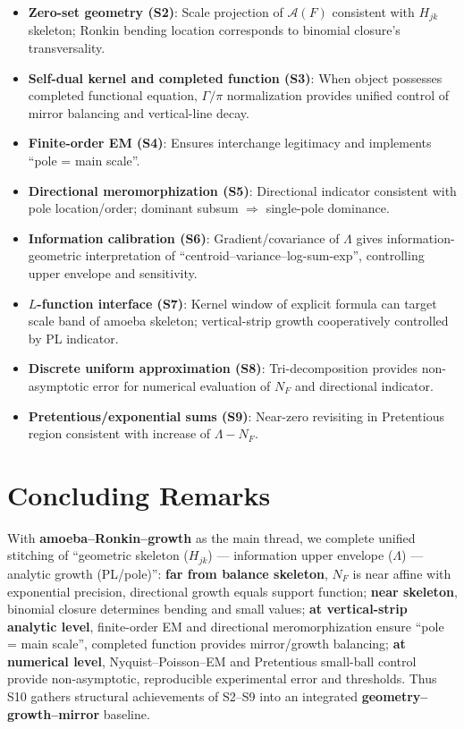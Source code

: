 \documentclass[11pt,a4paper]{article}
\theoremstyle{remark}
\begin{document}
\begin{itemize}
\item \textbf{Zero-set geometry (S2)}: Scale projection of $\mathcal{A}(F)$ consistent with $H_{jk}$ skeleton; Ronkin bending location corresponds to binomial closure's transversality.

\item \textbf{Self-dual kernel and completed function (S3)}: When object possesses completed functional equation, $\Gamma/\pi$ normalization provides unified control of mirror balancing and vertical-line decay.

\item \textbf{Finite-order EM (S4)}: Ensures interchange legitimacy and implements ``pole = main scale''.

\item \textbf{Directional meromorphization (S5)}: Directional indicator consistent with pole location/order; dominant subsum $\Rightarrow$ single-pole dominance.

\item \textbf{Information calibration (S6)}: Gradient/covariance of $\Lambda$ gives information-geometric interpretation of ``centroid--variance--log-sum-exp'', controlling upper envelope and sensitivity.

\item \textbf{$L$-function interface (S7)}: Kernel window of explicit formula can target scale band of amoeba skeleton; vertical-strip growth cooperatively controlled by PL indicator.

\item \textbf{Discrete uniform approximation (S8)}: Tri-decomposition provides non-asymptotic error for numerical evaluation of $N_F$ and directional indicator.

\item \textbf{Pretentious/exponential sums (S9)}: Near-zero revisiting in Pretentious region consistent with increase of $\Lambda-N_F$.
\end{itemize}

\section*{Concluding Remarks}

With \textbf{amoeba--Ronkin--growth} as the main thread, we complete unified stitching of ``geometric skeleton ($H_{jk}$) --- information upper envelope ($\Lambda$) --- analytic growth (PL/pole)'': \textbf{far from balance skeleton}, $N_F$ is near affine with exponential precision, directional growth equals support function; \textbf{near skeleton}, binomial closure determines bending and small values; \textbf{at vertical-strip analytic level}, finite-order EM and directional meromorphization ensure ``pole = main scale'', completed function provides mirror/growth balancing; \textbf{at numerical level}, Nyquist--Poisson--EM and Pretentious small-ball control provide non-asymptotic, reproducible experimental error and thresholds. Thus S10 gathers structural achievements of S2--S9 into an integrated \textbf{geometry--growth--mirror} baseline.
\end{document}
